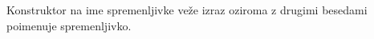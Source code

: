 Konstruktor  na ime spremenljivke veže izraz oziroma z drugimi besedami poimenuje spremenljivko.
\begin{prooftree}
\end{prooftree}
\begin{prooftree}
\end{prooftree}
























